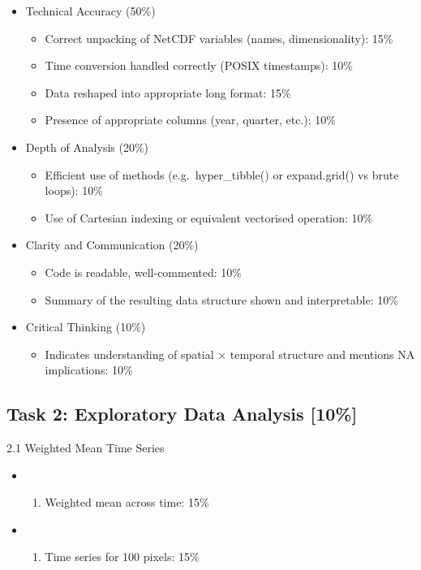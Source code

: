 \documentclass[
  10pt,
]{article}
\providecommand{\tightlist}{%
  \setlength{\itemsep}{0pt}\setlength{\parskip}{0pt}}
\begin{document}
\begin{itemize}
\tightlist
\item
  Technical Accuracy (50\%)

  \begin{itemize}
  \tightlist
  \item
    Correct unpacking of NetCDF variables (names, dimensionality): 15\%
  \item
    Time conversion handled correctly (POSIX timestamps): 10\%
  \item
    Data reshaped into appropriate long format: 15\%
  \item
    Presence of appropriate columns (year, quarter, etc.): 10\%
  \end{itemize}
\item
  Depth of Analysis (20\%)

  \begin{itemize}
  \tightlist
  \item
    Efficient use of methods (e.g.~hyper\_tibble() or expand.grid() vs
    brute loops): 10\%
  \item
    Use of Cartesian indexing or equivalent vectorised operation: 10\%
  \end{itemize}
\item
  Clarity and Communication (20\%)

  \begin{itemize}
  \tightlist
  \item
    Code is readable, well-commented: 10\%
  \item
    Summary of the resulting data structure shown and interpretable:
    10\%
  \end{itemize}
\item
  Critical Thinking (10\%)

  \begin{itemize}
  \tightlist
  \item
    Indicates understanding of spatial × temporal structure and mentions
    NA implications: 10\%
  \end{itemize}
\end{itemize}

\subsection{Task 2: Exploratory Data Analysis
{[}10\%{]}}\label{task-2-exploratory-data-analysis-10}

2.1 Weighted Mean Time Series

\begin{itemize}
\tightlist
\item
  \begin{enumerate}
  \def\labelenumi{(\arabic{enumi})}
  \tightlist
  \item
    Weighted mean across time: 15\%
  \end{enumerate}
\item
  \begin{enumerate}
  \def\labelenumi{(\arabic{enumi})}
  \setcounter{enumi}{1}
  \tightlist
  \item
    Time series for 100 pixels: 15\%
  \end{enumerate}
\end{itemize}
\end{document}
